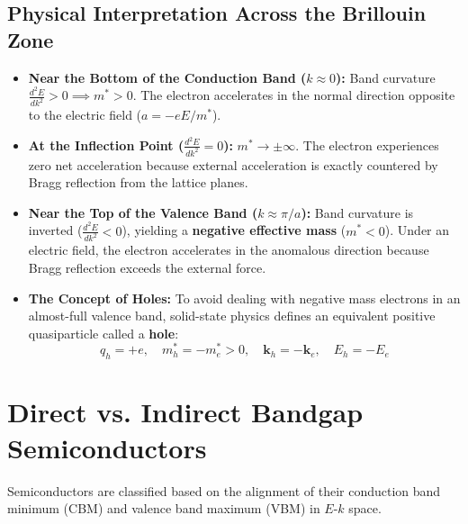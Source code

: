 \subsection{Physical Interpretation Across the Brillouin Zone}
\begin{itemize}
    \item \textbf{Near the Bottom of the Conduction Band ($k \approx 0$):} Band curvature $\frac{d^2E}{dk^2} > 0 \implies m^* > 0$. The electron accelerates in the normal direction opposite to the electric field ($a = -eE/m^*$).
    \item \textbf{At the Inflection Point ($\frac{d^2E}{dk^2} = 0$):} $m^* \to \pm \infty$. The electron experiences zero net acceleration because external acceleration is exactly countered by Bragg reflection from the lattice planes.
    \item \textbf{Near the Top of the Valence Band ($k \approx \pi/a$):} Band curvature is inverted ($\frac{d^2E}{dk^2} < 0$), yielding a \textbf{negative effective mass} ($m^* < 0$). Under an electric field, the electron accelerates in the anomalous direction because Bragg reflection exceeds the external force.
    \item \textbf{The Concept of Holes:} To avoid dealing with negative mass electrons in an almost-full valence band, solid-state physics defines an equivalent positive quasiparticle called a \textbf{hole}:
    \begin{equation}
        q_h = +e, \quad m_h^* = -m_e^* > 0, \quad \mathbf{k}_h = -\mathbf{k}_e, \quad E_h = -E_e
    \end{equation}
\end{itemize}

\section{Direct vs. Indirect Bandgap Semiconductors}
Semiconductors are classified based on the alignment of their conduction band minimum (CBM) and valence band maximum (VBM) in $E$-$k$ space.

